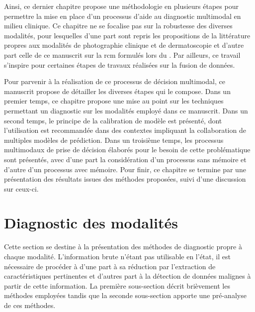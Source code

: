 Ainsi, ce dernier chapitre propose une méthodologie en plusieurs étapes pour permettre la mise en place d'un processus d'aide au diagnostic multimodal en milieu clinique. Ce chapitre ne se focalise pas sur la robustesse des diverses modalités, pour lesquelles d'une part sont repris les propositions de la littérature propres aux modalités de photographie clinique et de dermatoscopie et d'autre part celle de ce manuscrit sur la \gls{rcm} formulés lors du . Par ailleurs, ce travail s'inspire pour certaines étapes de travaux réalisées sur la fusion de données.

Pour parvenir à la réalisation de ce processus de décision multimodal, ce manuscrit propose de détailler les diverses étapes qui le compose. Dans un premier temps, ce chapitre propose une mise au point sur les techniques permettant un diagnostic sur les modalités employé dans ce manuscrit. Dans un second temps, le principe de la calibration de modèle est présenté, dont l'utilisation est recommandée dans des contextes impliquant la collaboration de multiples modèles de prédiction. Dans un troisième temps, les processus multimodaux de prise de décision élaborés pour le besoin de cette problématique sont présentés, avec d'une part la considération d'un processus sans mémoire et d'autre d'un processus avec mémoire. Pour finir, ce chapitre se termine par une présentation des résultats issues des méthodes proposées, suivi d'une discussion sur ceux-ci.\par
\clearpage

\section{Diagnostic des modalités}
\label{sec:modality_diagnosis}
Cette section se destine à la présentation des méthodes de diagnostic propre à chaque modalité. L'information brute n'étant pas utilisable en l'état, il est nécessaire de procéder à d'une part à sa réduction par l'extraction de caractéristiques pertinentes et d'autres part à la détection de données malignes à partir de cette information. La première sous-section décrit brièvement les méthodes employées tandis que la seconde sous-section apporte une pré-analyse de ces méthodes.\par

